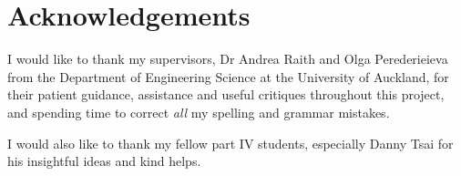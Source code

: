 \chapter*{Acknowledgements}
I would like to thank my supervisors, Dr Andrea Raith and Olga Perederieieva from the Department of Engineering Science at the University of Auckland,
for their patient guidance, assistance and useful critiques throughout this project, and spending time to correct \emph{all} my spelling and grammar mistakes.

I would also like to thank my fellow part IV students, especially Danny Tsai for his insightful ideas and kind helps.
